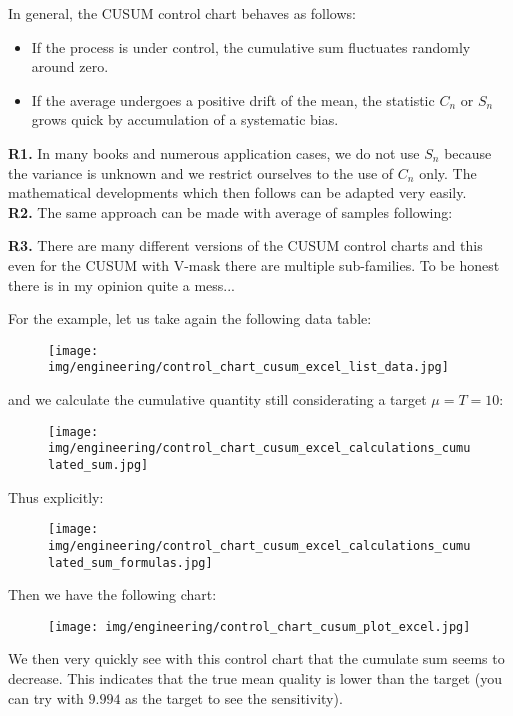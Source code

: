 	In general, the CUSUM control chart behaves as follows:
	\begin{itemize}
		\item If the process is under control, the cumulative sum fluctuates randomly around zero.

		\item If the average undergoes a positive drift of the mean, the statistic $C_n$ or $S_n$ grows quick by accumulation of a systematic bias.
	\end{itemize}
	\begin{tcolorbox}[title=Remarks,colframe=black,arc=10pt]
	\textbf{R1.} In many books and numerous application cases, we do not use $S_n$ because the variance is unknown and we restrict ourselves to the use of $C_n$ only. The mathematical developments which then follows can be adapted very easily.\\
	
	\textbf{R2.} The same approach can be made with average of samples following:
	
	
	\textbf{R3.} There are many different versions of the CUSUM control charts and this even for the CUSUM with V-mask there are multiple sub-families. To be honest there is in my opinion quite a mess...
	\end{tcolorbox}
	For the example, let us take again the following data table:
	\begin{figure}[H]
		\centering
		\texttt{[image: img/engineering/control\_chart\_cusum\_excel\_list\_data.jpg]}
	\end{figure}
	and we calculate the cumulative quantity still considerating a target $\mu=T=10$:
	\begin{figure}[H]
		\centering
		\texttt{[image: img/engineering/control\_chart\_cusum\_excel\_calculations\_cumulated\_sum.jpg]}
	\end{figure}
	Thus explicitly:
	\begin{figure}[H]
		\centering
		\texttt{[image: img/engineering/control\_chart\_cusum\_excel\_calculations\_cumulated\_sum\_formulas.jpg]}
	\end{figure}
	Then we have the following chart:
	\begin{figure}[H]
		\centering
		\texttt{[image: img/engineering/control\_chart\_cusum\_plot\_excel.jpg]}
	\end{figure}
	We then very quickly see with this control chart that the cumulate sum seems to decrease. This indicates that the true mean quality is lower than the target (you can try with $9.994$ as the target to see the sensitivity).
	
